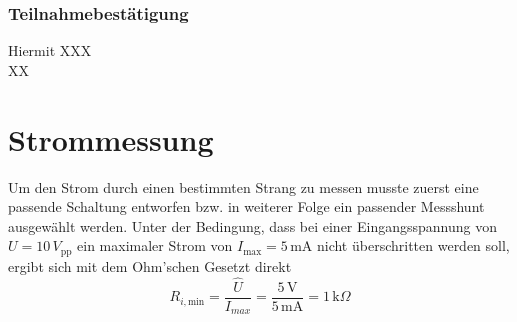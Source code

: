 \subsubsection{Teilnahmebestätigung}


Hiermit XXX \\
XX

\section{Strommessung}
Um den Strom durch einen bestimmten Strang zu messen musste zuerst eine passende Schaltung entworfen bzw. in weiterer Folge ein passender Messshunt ausgewählt werden. Unter der Bedingung, dass bei einer Eingangsspannung von $U=10\,V_{\text{pp}}$ ein maximaler Strom von $I_{\text{max}}=5\,$mA nicht überschritten werden soll, ergibt sich mit dem Ohm'schen Gesetzt direkt
\begin{equation}
	R_{i,\text{min}} = \frac{\hat{U}}{I_{max}} = \frac{5\,\text{V}}{5\,\text{mA}} = 1\,\text{k}\Omega
	\label{eq:widerstandsdim}
\end{equation}
